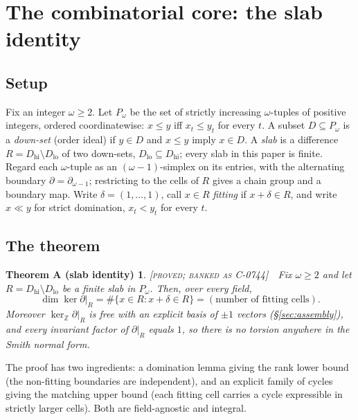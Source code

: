 \documentclass[11pt,reqno]{amsart}
\theoremstyle{plain}
\theoremstyle{definition}
\theoremstyle{plain}
\newtheorem*{thmA}{Theorem A (slab identity)}
\newcommand{\Z}{\mathbb{Z}}
\newcommand{\dd}{\delta}
\newcommand{\st}{\textsc}
\begin{document}
\section{The combinatorial core: the slab identity}\label{sec:slab}

\subsection{Setup}
Fix an integer $\omega\ge2$. Let $P_\omega$ be the set of strictly increasing $\omega$-tuples
of positive integers, ordered coordinatewise: $x\le y$ iff $x_t\le y_t$ for every $t$. A
subset $D\subseteq P_\omega$ is a \emph{down-set} (order ideal) if $y\in D$ and $x\le y$ imply
$x\in D$. A \emph{slab} is a difference $R=D_{\mathrm{hi}}\setminus D_{\mathrm{lo}}$ of two
down-sets, $D_{\mathrm{lo}}\subseteq D_{\mathrm{hi}}$; every slab in this paper is finite.
Regard each $\omega$-tuple as an $(\omega-1)$-simplex on its entries, with the alternating
boundary $\partial=\partial_{\omega-1}$; restricting to the cells of $R$ gives a chain group
and a boundary map. Write $\dd=(1,\dots,1)$, call $x\in R$ \emph{fitting} if $x+\dd\in R$, and
write $x\ll y$ for strict domination, $x_t<y_t$ for every $t$.

\subsection{The theorem}
\begin{thmA}
\textnormal{\st{[proved; banked as C-0744]}}\ \ Fix $\omega\ge2$ and let
$R=D_{\mathrm{hi}}\setminus D_{\mathrm{lo}}$ be a finite slab in $P_\omega$. Then, over every
field,
\[
\dim\ker\partial|_R=\#\{x\in R: x+\dd\in R\}=(\text{number of fitting cells}).
\]
Moreover $\ker_{\Z}\partial|_R$ is free with an explicit basis of $\pm1$ vectors
(\S\ref{sec:assembly}), and every invariant factor of $\partial|_R$ equals $1$, so there is no
torsion anywhere in the Smith normal form.
\end{thmA}

\noindent The proof has two ingredients: a domination lemma giving the rank lower bound (the
non-fitting boundaries are independent), and an explicit family of cycles giving the matching
upper bound (each fitting cell carries a cycle expressible in strictly larger cells). Both are
field-agnostic and integral.
\end{document}
